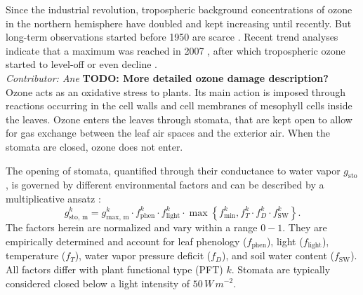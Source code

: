 \documentclass[bg, manuscript]{copernicus}
\begin{document}
Since the industrial revolution, tropospheric background concentrations of ozone in the northern hemisphere have doubled and kept increasing until recently. But long-term observations started before 1950 are scarce \citep[Chapter 2]{IPCC2013}. Recent trend analyses indicate that a maximum was reached in 2007 \citep{AE:Derwent2018}, after which tropospheric ozone started to level-off or even decline \citep{ACP:Wespes2018,ESA:Gaudel2018}.\\

\emph{Contributor: Ane} {\bf TODO: More detailed ozone damage description?}\\
Ozone acts as an oxidative stress to plants. Its main action is imposed through reactions occurring in the cell walls and cell membranes of mesophyll cells inside the leaves. Ozone enters the leaves through stomata, that are kept open to allow for gas exchange between the leaf air spaces and the exterior air. When the stomata are closed, ozone does not enter.

The opening of stomata, quantified through their conductance to water vapor $g_\mathrm{sto}$, is governed by different environmental factors and can be described by a multiplicative ansatz \citep{PTRS:Jarvis1976,ICP:MappingManual2017}:
\begin{equation}
  g^k_\text{sto, m} = g^k_\text{max, m} \cdot f^k_\text{phen} \cdot f^k_\text{light} \cdot \max{\left\{f^k_\text{min}, f^k_T \cdot f^k_D \cdot f^k_\text{SW}\right\}}.
  \label{eq:stomatal}
\end{equation}
%
The factors herein are normalized and vary within a range $0-1$. They are empirically determined and account for leaf phenology ($f_\text{phen}$), light ($f_\text{light}$), temperature ($f_T$), water vapor pressure deficit ($f_D$), and soil water content ($f_\text{SW}$). All factors differ with plant functional type (PFT) $k$. Stomata are typically considered closed below a light intensity of $50\,\unit{W\,m^{-2}}$.
\end{document}
